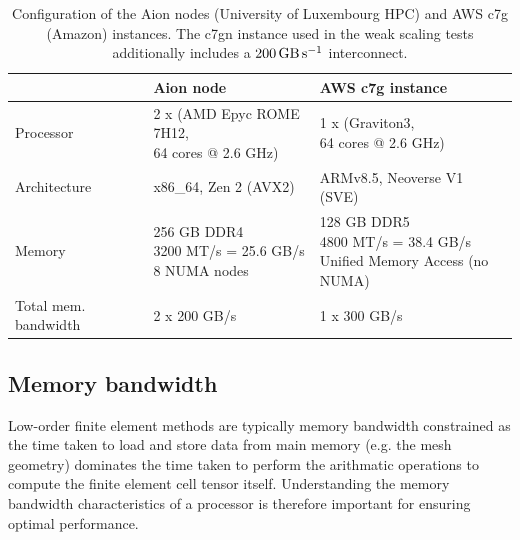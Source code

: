 \begin{table}
  \footnotesize
  \renewcommand{\arraystretch}{1.5}
  \begin{tabular}{l|l|l}
                              & Aion node                                                          & AWS c7g instance \\ \hline \hline
    Processor                 & \makecell[l]{2 x (AMD Epyc ROME 7H12, \\ 64 cores @ 2.6 GHz)}      & \makecell[l]{1 x (Graviton3, \\ 64 cores @ 2.6 GHz)} \\ \hline
    Architecture              & x86\_64, Zen 2 (AVX2)                                              & ARMv8.5, Neoverse V1 (SVE) \\ \hline
    Memory                    & \makecell[l]{256 GB DDR4 \\ 3200 MT/s = 25.6 GB/s \\ 8 NUMA nodes} & \makecell[l]{128 GB DDR5 \\ 4800 MT/s = 38.4 GB/s \\ Unified Memory Access (no NUMA) } \\ \hline
    Total mem. bandwidth      & 2 x 200 GB/s                                                       & 1 x 300 GB/s \\ \hline
  \end{tabular}
  \vspace{5pt}
  \caption{Configuration of the Aion nodes (University of Luxembourg HPC) and AWS c7g (Amazon) instances. The c7gn instance used in the weak scaling tests additionally includes a $\SI{200}{\giga\byte\per\second}$ interconnect.}
  \label{tab:aion-aws-config}
\end{table}

\subsection*{Memory bandwidth}

Low-order finite element methods are typically memory bandwidth constrained as
the time taken to load and store data from main memory (e.g. the mesh geometry)
dominates the time taken to perform the arithmatic operations to compute the
finite element cell tensor itself. Understanding the memory bandwidth
characteristics of a processor is therefore important for ensuring optimal
performance.

